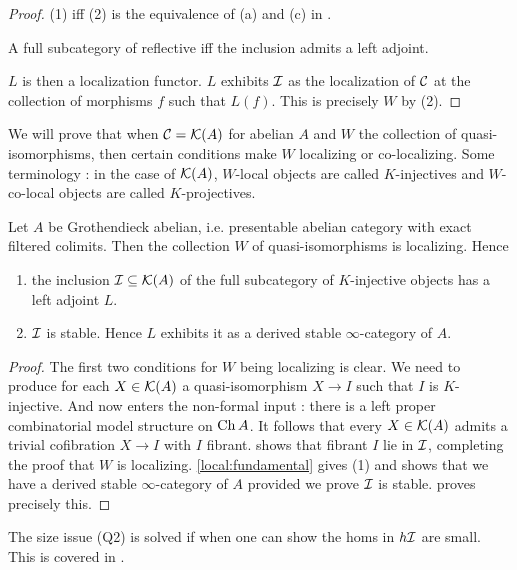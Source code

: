 \documentclass{article}
\begin{document}
\begin{proof}
  (1) iff (2) is the equivalence of (a) and (c)
  in \cite[\href{https://kerodon.net/tag/05Z2}{Tag 05Z2}]{kerodon}.

  A full subcategory of reflective iff the inclusion 
  admits a left adjoint.\cite[\href{https://kerodon.net/tag/02FA}{Tag 02FA}]{kerodon}

  $L$ is then a localization functor.
  \cite[\href{https://kerodon.net/tag/04JL}{Tag 04JL}]{kerodon}
  $L$ exhibits $\mathcal{I}$ as the localization of $\mathcal{C}$ at
  the collection of morphisms $f$ such that $L(f)$.
  \cite[\href{https://kerodon.net/tag/04JH}{Tag 04JH}]{kerodon}
  This is precisely $W$ by (2).
\end{proof}

We will prove that when $\mathcal{C} = \mathcal{K}(A)$ for abelian $A$ 
and $W$ the collection of quasi-isomorphisms,
then certain conditions make $W$ localizing or co-localizing.
Some terminology : in the case of $\mathcal{K}(A)$,
$W$-local objects are called $K$-injectives 
and $W$-co-local objects are called $K$-projectives.
\cite[\href{https://stacks.math.columbia.edu/tag/070G}{Tag 070G}]{stacks-project}

\begin{prop}
  Let $A$ be Grothendieck abelian,
  i.e. presentable abelian category with exact filtered colimits.
  Then the collection $W$ of quasi-isomorphisms is localizing.
  Hence \begin{enumerate}
    \item the inclusion $\mathcal{I} \subseteq \mathcal{K}(A)$ of the full subcategory of
    $K$-injective objects has a left adjoint $L$.
    \item $\mathcal{I}$ is stable. Hence 
    $L$ exhibits it as a derived stable $\infty$-category of $A$.
  \end{enumerate}
\end{prop}
\begin{proof}
  The first two conditions for $W$ being localizing is clear.
  We need to produce for each $X \in \mathcal{K}(A)$
  a quasi-isomorphism $X \to I$ such that $I$ is $K$-injective.
  And now enters the non-formal input :
  there is a left proper combinatorial model structure on $\mathrm{Ch}\,A$.
  \cite[Lem. 1.3.5.3]{lurie-HA}
  It follows that every $X \in \mathcal{K}(A)$ admits
  a trivial cofibration $X \to I$ with $I$ fibrant.
  \cite[Lem. 1.3.5.14]{lurie-HA} shows that
  fibrant $I$ lie in $\mathcal{I}$,
  completing the proof that $W$ is localizing.
  \ref{local:fundamental} gives (1) and shows that we have 
  a derived stable $\infty$-category of $A$ provided we prove $\mathcal{I}$ is stable.
  \cite[Prop. 1.3.5.9]{lurie-HA} proves precisely this.
\end{proof}
The size issue (Q2) is solved if when one can show
the homs in $h \mathcal{I}$ are small.
This is covered in \cite[Prop. 1.3.5.14]{lurie-HA}.
\end{document}
